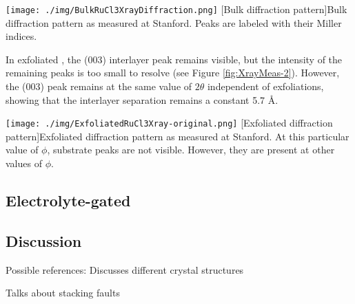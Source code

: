 \begin{centering}
\texttt{[image: ./img/BulkRuCl3XrayDiffraction.png]}
  \captionsetup{width=0.75\textwidth}
  [Bulk \rucl diffraction pattern]{Bulk \rucl diffraction pattern as measured at Stanford. Peaks are labeled with their Miller indices.} 
  \label{fig:XrayMeas-1}
\end{centering}

In exfoliated \ruclnospace , the (003) interlayer peak remains visible, but the intensity of the remaining peaks is too small to resolve (see Figure \ref{fig:XrayMeas-2}). However, the (003) peak remains at the same value of $2\theta$ independent of exfoliations, showing that the interlayer separation remains a constant 5.7 \AA .

\begin{centering}
\texttt{[image: ./img/ExfoliatedRuCl3Xray-original.png]}
  \captionsetup{width=0.75\textwidth}
  [Exfoliated \rucl diffraction pattern]{Exfoliated \rucl diffraction pattern as measured at Stanford. At this particular value of $\phi$, substrate peaks are not visible. However, they are present at other values of $\phi$.} 
  \label{fig:XrayMeas-2}
\end{centering}


\subsection{Electrolyte-gated \rucl}

\subsection{Discussion}


Possible references:
Discusses different crystal structures

Talks about stacking faults

\nocite{*}